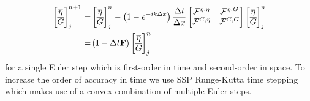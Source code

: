 \begin{align}
\label{eqn:singleEvolveStep}
\begin{bmatrix}
\overline{\eta} \\ \overline{G}
\end{bmatrix}^{n+1}_j =& \begin{bmatrix}
\overline{\eta} \\ \overline{G}
\end{bmatrix}^{n}_j - \left(1 - e^{-ik\Delta x}\right)\frac{\Delta t}{ \Delta x}\begin{bmatrix}
\mathcal{F}^{\eta,\eta} & \mathcal{F}^{\eta,G} \\\mathcal{F}^{G,\eta} &\mathcal{F}^{G,G} 
\end{bmatrix}\begin{bmatrix}
\overline{\eta} \\ \overline{G}
\end{bmatrix}^{n}_j \nonumber\\=& \left(\mathbf{I}  - \Delta t \mathbf{F} \right) \begin{bmatrix}
\overline{\eta} \\ \overline{G}
\end{bmatrix}^{n}_j
\end{align}
for a single Euler step which is first-order in time and second-order in space. To increase the order of accuracy in time we use SSP Runge-Kutta time stepping which makes use of a convex combination of multiple Euler steps.

